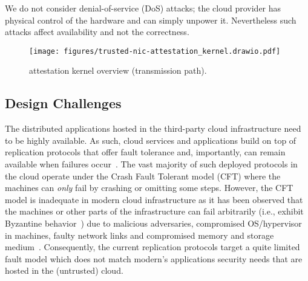We do not consider denial-of-service (DoS) attacks; the cloud provider has physical control of the hardware and can simply unpower it. Nevertheless such attacks affect availability and not the correctness.













\begin{figure}[t!]
    \centering
    \texttt{[image: figures/trusted-nic-attestation\_kernel.drawio.pdf]}
    \caption{\trustedfpga{} attestation kernel overview (transmission path).}
    \label{fig:attestation_kernel}
\end{figure}    
\fi




\subsection{Design Challenges}
 The distributed applications hosted in the third-party cloud infrastructure need to be highly available. As such, cloud services and applications build on top of replication protocols that offer fault tolerance and, importantly, can remain available when failures occur~\cite{Jimenez-Peris2001}. The vast majority of such deployed protocols in the cloud operate under the Crash Fault Tolerant model (CFT) where the machines can {\em only} fail by crashing or omitting some steps. However, the CFT model is inadequate in modern cloud infrastructure as it has been observed that the machines or other parts of the infrastructure can fail arbitrarily (i.e., exhibit Byzantine behavior~\cite{Lamport:1982}) due to malicious adversaries, compromised OS/hypervisor in machines, faulty network links and compromised memory and storage medium~\cite{Gunawi_bugs-in-the-cloud, ciad, fast-08-corruption, security-one-sided-communication, accountable-cloud}. Consequently, the current replication protocols target a quite limited fault model which does not match modern's applications security needs that are hosted in the (untrusted) cloud.

